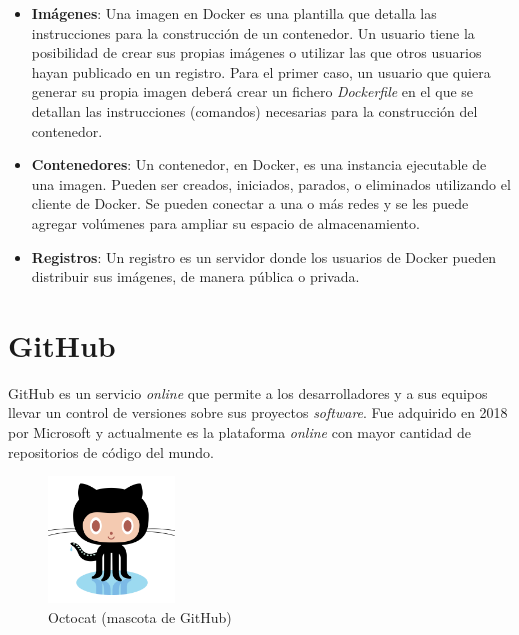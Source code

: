 \begin{itemize}
    \item \textbf{Imágenes}: Una imagen en Docker es una plantilla que detalla las instrucciones para la construcción de un contenedor. Un usuario tiene la posibilidad de crear sus propias imágenes o utilizar las que otros usuarios hayan publicado en un registro. Para el primer caso, un usuario que quiera generar su propia imagen deberá crear un fichero \emph{Dockerfile} en el que se detallan las instrucciones (comandos) necesarias para la construcción del contenedor.
    \item \textbf{Contenedores}: Un contenedor, en Docker, es una instancia ejecutable de una imagen. Pueden ser creados, iniciados, parados, o eliminados utilizando el cliente de Docker. Se pueden conectar a una o más redes y se les puede agregar volúmenes para ampliar su espacio de almacenamiento.
    \item \textbf{Registros}: Un registro es un servidor donde los usuarios de Docker pueden distribuir sus imágenes, de manera pública o privada.
\end{itemize}


\section{GitHub}\label{sec:github}

GitHub es un servicio \emph{online} que permite a los desarrolladores y a sus equipos llevar un control de versiones sobre sus proyectos \emph{software}. Fue adquirido en 2018 por Microsoft y actualmente es la plataforma \emph{online} con mayor cantidad de repositorios de código del mundo. \emph{\parencite{Reference21}}

\begin{figure}[ht]
    \centering
    \includegraphics[width=0.3\textwidth]{Figures/octocat}
    \decoRule
    \caption[Octocat]{Octocat (mascota de GitHub) \emph{\parencite{Reference23}}}
    \label{fig:octocat}
\end{figure}

